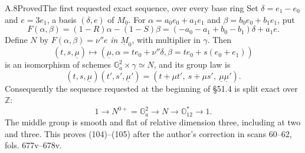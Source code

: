\begin{statement}{A.8}{Proved}{The first requested exact sequence, over every base ring}
Set $\delta=e_1-e_0$ and $e=3e_1$, a basis $(\delta,e)$ of $M_0$.
For $\alpha=a_0e_0+a_1e_1$ and $\beta=b_0e_0+b_1e_1$, put
\[
 F(\alpha,\beta)=(1-R)\alpha-(1-S)\beta
   =(-a_0-a_1+b_0-b_1)\delta+a_1e.                 \tag{A.8.1}
\]
Define $N$ by $F(\alpha,\beta)=\nu''e$ \emph{in}
$\underline M_0$, with multiplier in $\gamma$. Then
\[
 (t,s,\underline\mu)\longmapsto
 \left(\underline\mu,
       \alpha=t e_0+\nu''\delta,
       \beta=t e_0+s(e_0+e_1)\right)                \tag{A.8.2}
\]
is an isomorphism of schemes $\mathbb G_a^2\times\gamma\simeq N$,
and its group law is
\[
 (t,s,\underline\mu)(t',s',\underline\mu')
 =(t+\mu t',\ s+\mu s',\ \underline\mu\underline\mu'). \tag{A.8.3}
\]
Consequently the sequence requested at the beginning of \S51.4 is
split exact over $\mathbb Z$:
\[
 1\longrightarrow N^{0+}=\mathbb G_a^2
 \longrightarrow N\longrightarrow\mathbb O_{12}^*
 \longrightarrow1.                               \tag{A.8.4}
\]
The middle group is smooth and flat of relative dimension three,
including at two and three. This proves (104)--(105) after the
author's correction in scans 60--62, fols. 677v--678v.
\end{statement}
